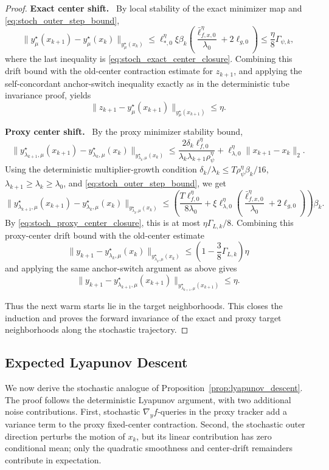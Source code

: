 \documentclass{article}
\newcommand{\proofstep}[1]{\par\smallskip\noindent\textbf{#1}\ }
\begin{document}
\begin{proof}
\proofstep{Exact center shift.}
By local stability of the exact minimizer map and \eqref{eq:stoch_outer_step_bound},
\[
\|y_\mu^\star(x_{k+1})-y_\mu^\star(x_k)\|_{y_\mu^\star(x_k)}
\le
\ell_{*,0}^{\eta}
\xi\beta_k
\left(\frac{\bar\ell_{f,x,0}^{\eta}}{\lambda_0}+2\ell_{g,0}\right)
\le
\frac{\eta}{8}\Gamma_{\psi,k},
\]
where the last inequality is \eqref{eq:stoch_exact_center_closure}. Combining this drift bound with
the old-center contraction estimate for \(z_{k+1}\), and applying the self-concordant anchor-switch
inequality exactly as in the deterministic tube invariance proof, yields
\[
\|z_{k+1}-y_\mu^\star(x_{k+1})\|_{y_\mu^\star(x_{k+1})}\le \eta .
\]

\proofstep{Proxy center shift.}
By the proxy minimizer stability bound,
\[
\|y_{\lambda_{k+1},\mu}^\star(x_{k+1})
-
y_{\lambda_k,\mu}^\star(x_k)\|_{y_{\lambda_k,\mu}^\star(x_k)}
\le
\frac{2\delta_k\ell_{f,0}^{\eta}}{\lambda_k\lambda_{k+1}\rho_\psi^\eta}
+
\ell_{\lambda,0}^{\eta}\|x_{k+1}-x_k\|_2 .
\]
Using the deterministic multiplier-growth condition
\(\delta_k/\lambda_k\le T\rho_\psi^\eta\beta_k/16\), \(\lambda_{k+1}\ge\lambda_k\ge\lambda_0\), and
\eqref{eq:stoch_outer_step_bound}, we get
\[
\|y_{\lambda_{k+1},\mu}^\star(x_{k+1})
-
y_{\lambda_k,\mu}^\star(x_k)\|_{y_{\lambda_k,\mu}^\star(x_k)}
\le
\left(
\frac{T\ell_{f,0}^{\eta}}{8\lambda_0}
+
\xi\ell_{\lambda,0}^{\eta}
\left(\frac{\bar\ell_{f,x,0}^{\eta}}{\lambda_0}+2\ell_{g,0}\right)
\right)\beta_k .
\]
By \eqref{eq:stoch_proxy_center_closure}, this is at most
\(\eta\Gamma_{L,k}/8\). Combining this proxy-center drift bound with the old-center estimate
\[
\|y_{k+1}-y_{\lambda_k,\mu}^\star(x_k)\|_{y_{\lambda_k,\mu}^\star(x_k)}
\le
\left(1-\frac{3}{8}\Gamma_{L,k}\right)\eta
\]
and applying the same anchor-switch argument as above gives
\[
\|y_{k+1}-y_{\lambda_{k+1},\mu}^\star(x_{k+1})\|_{y_{\lambda_{k+1},\mu}^\star(x_{k+1})}
\le
\eta .
\]

Thus the next warm starts lie in the target neighborhoods. This closes the induction and proves the forward
invariance of the exact and proxy target neighborhoods along the stochastic trajectory.
\end{proof}


\subsection{Expected Lyapunov Descent}
\label{app:stoch_lyapunov}

We now derive the stochastic analogue of Proposition~\ref{prop:lyapunov_descent}. The proof follows
the deterministic Lyapunov argument, with two additional noise contributions. First, stochastic
\(\nabla_y f\)-queries in the proxy tracker add a variance term to the proxy fixed-center contraction.
Second, the stochastic outer direction perturbs the motion of \(x_k\), but its linear contribution has
zero conditional mean; only the quadratic smoothness and center-drift remainders contribute in
expectation.
\end{document}
